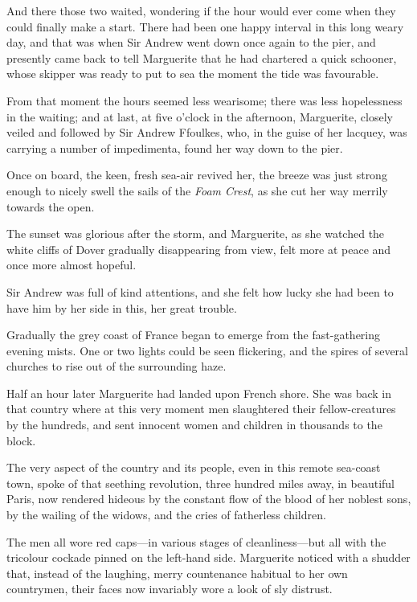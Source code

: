 And there those two waited, wondering if the hour would ever come when they could finally make a start. There had been one happy interval in this long weary day, and that was when Sir Andrew went down once again to the pier, and presently came back to tell Marguerite that he had chartered a quick schooner, whose skipper was ready to put to sea the moment the tide was favourable.

From that moment the hours seemed less wearisome; there was less hopelessness in the waiting; and at last, at five o'clock in the afternoon, Marguerite, closely veiled and followed by Sir Andrew Ffoulkes, who, in the guise of her lacquey, was carrying a number of impedimenta, found her way down to the pier.

Once on board, the keen, fresh sea-air revived her, the breeze was just strong enough to nicely swell the sails of the \textit{Foam Crest}, as she cut her way merrily towards the open.

The sunset was glorious after the storm, and Marguerite, as she watched the white cliffs of Dover gradually disappearing from view, felt more at peace and once more almost hopeful.

Sir Andrew was full of kind attentions, and she felt how lucky she had been to have him by her side in this, her great trouble.

Gradually the grey coast of France began to emerge from the fast-gathering evening mists. One or two lights could be seen flickering, and the spires of several churches to rise out of the surrounding haze.

Half an hour later Marguerite had landed upon French shore. She was back in that country where at this very moment men slaughtered their fellow-creatures by the hundreds, and sent innocent women and children in thousands to the block.

The very aspect of the country and its people, even in this remote sea-coast town, spoke of that seething revolution, three hundred miles away, in beautiful Paris, now rendered hideous by the constant flow of the blood of her noblest sons, by the wailing of the widows, and the cries of fatherless children.

The men all wore red caps\allowbreak---\allowbreak in various stages of  cleanliness\allowbreak---\allowbreak but all with the tricolour cockade pinned on the left-hand side. Marguerite noticed with a shudder that, instead of the laughing, merry countenance habitual to her own countrymen, their faces now invariably wore a look of sly distrust.


